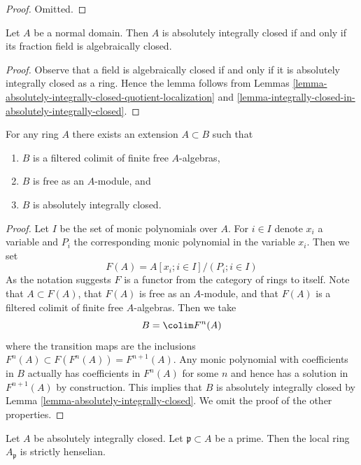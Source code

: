 \begin{proof}
Omitted.
\end{proof}

\begin{lemma}
\label{lemma-normal-domain-absolutely-integrally-closed}
Let $A$ be a normal domain. Then $A$ is absolutely integrally closed
if and only if its fraction field is algebraically closed.
\end{lemma}

\begin{proof}
Observe that a field is algebraically closed if and only if
it is absolutely integrally closed as a ring. Hence the lemma follows
from Lemmas \ref{lemma-absolutely-integrally-closed-quotient-localization} and
\ref{lemma-integrally-closed-in-absolutely-integrally-closed}.
\end{proof}

\begin{lemma}
\label{lemma-construct-absolute-integral-closure}
For any ring $A$ there exists an extension $A \subset B$ such that
\begin{enumerate}
\item $B$ is a filtered colimit of finite free $A$-algebras,
\item $B$ is free as an $A$-module, and
\item $B$ is absolutely integrally closed.
\end{enumerate}
\end{lemma}

\begin{proof}
Let $I$ be the set of monic polynomials over $A$. For $i \in I$
denote $x_i$ a variable and $P_i$ the corresponding monic polynomial
in the variable $x_i$. Then we set
$$
F(A) = A[x_i; i \in I]/(P_i; i \in I)
$$
As the notation suggests $F$ is a functor from the category
of rings to itself. Note that $A \subset F(A)$, that $F(A)$ is free
as an $A$-module, and that $F(A)$ is a filtered colimit of
finite free $A$-algebras. Then we take
$$
B = \colim F^n(A)
$$
where the transition maps are the inclusions
$F^n(A) \subset F(F^n(A)) = F^{n + 1}(A)$.
Any monic polynomial with coefficients in $B$
actually has coefficients in $F^n(A)$ for some $n$
and hence has a solution in $F^{n + 1}(A)$ by construction.
This implies that $B$ is absolutely integrally closed by
Lemma \ref{lemma-absolutely-integrally-closed}.
We omit the proof of the other properties.
\end{proof}

\begin{lemma}
\label{lemma-absolutely-integrally-closed-strictly-henselian}
Let $A$ be absolutely integrally closed. Let $\mathfrak p \subset A$
be a prime. Then the local ring $A_\mathfrak p$ is strictly henselian.
\end{lemma}

